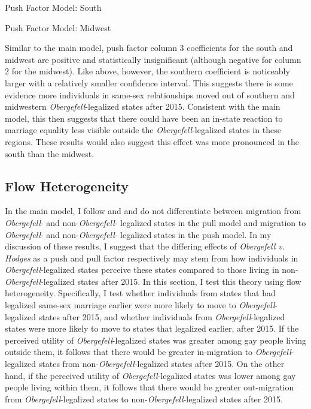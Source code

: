 \documentclass[12pt,letterpaper]{article}
\begin{document}
\begin{table}[htbp] %
    \centering
    \caption{Push Factor Model: South}
    \label{tab: south_exante_model}
    
\end{table}
\begin{table}[htbp] %
    \centering
    \caption{Push Factor Model: Midwest}
    \label{tab: midwest_exante_model}
    
\end{table}

Similar to the main model, push factor column 3 coefficients for the south and midwest are positive and statistically insignificant (although negative for column 2 for the midwest). Like above, however, the southern coefficient is noticeably larger with a relatively smaller confidence interval. This suggests there is some evidence more individuals in same-sex relationships moved out of southern and midwestern \textit{Obergefell}-legalized states after 2015. Consistent with the main model, this then suggests that there could have been an in-state reaction to marriage equality less visible outside the \textit{Obergefell}-legalized states in these regions. These results would also suggest this effect was more pronounced in the south than the midwest.


\FloatBarrier
\subsection{Flow Heterogeneity}

In the main model, I follow \citet{1} and \citet{12} and do not differentiate between migration from \textit{Obergefell}- and non-\textit{Obergefell}- legalized states in the pull model and migration to \textit{Obergefell}- and non-\textit{Obergefell}- legalized states in the push model.  In my discussion of these results, I suggest that the differing effects of \textit{Obergefell v. Hodges} as a push and pull factor respectively may stem from how individuals in \textit{Obergefell}-legalized states perceive these states compared to those living in non-\textit{Obergefell}-legalized states after 2015.  In this section, I test this theory using flow heterogeneity.  Specifically, I test whether individuals from states that had legalized same-sex marriage earlier were more likely to move to \textit{Obergefell}-legalized states after 2015, and whether individuals from \textit{Obergefell}-legalized states were more likely to move to states that legalized earlier, after 2015. If the perceived utility of \textit{Obergefell}-legalized states was greater among gay people living outside them, it follows that there would be greater in-migration to \textit{Obergefell}-legalized states from non-\textit{Obergefell}-legalized states after 2015. On the other hand, if the perceived utility of \textit{Obergefell}-legalized states was lower among gay people living within them, it follows that there would be greater out-migration from \textit{Obergefell}-legalized states to non-\textit{Obergefell}-legalized states after 2015.
\end{document}
